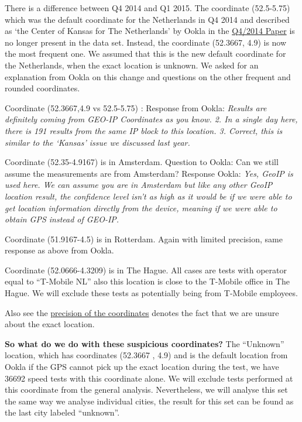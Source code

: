 \documentclass[]{article}
\begin{document}
There is a difference between Q4 2014 and Q1 2015. The coordinate
(52.5-5.75) which was the default coordinate for the Netherlands in Q4
2014 and described as `the Center of Kansas for The Netherlands' by
Ookla in the
\href{https://github.com/hugokoopmans/ookla-speedtest-analysis/blob/master/speedtest-analysis-final-1.3.pdf}{Q4/2014
Paper} is no longer present in the data set. Instead, the coordinate
(52.3667, 4.9) is now the most frequent one. We assumed that this is the
new default coordinate for the Netherlands, when the exact location is
unknown. We asked for an explanation from Ookla on this change and
questions on the other frequent and rounded coordinates.

Coordinate (52.3667,4.9 vs 52.5-5.75) : Response from Ookla:
\emph{Results are definitely coming from GEO-IP Coordinates as you know.
2. In a single day here, there is 191 results from the same IP block to
this location. 3. Correct, this is similar to the `Kansas' issue we
discussed last year.}

Coordinate (52.35-4.9167) is in Amsterdam. Question to Ookla: Can we
still assume the measurements are from Amsterdam? Response Ookla:
\emph{Yes, GeoIP is used here. We can assume you are in Amsterdam but
like any other GeoIP location result, the confidence level isn't as high
as it would be if we were able to get location information directly from
the device, meaning if we were able to obtain GPS instead of GEO-IP.}

Coordinate (51.9167-4.5) is in Rotterdam. Again with limited precision,
same response as above from Ookla.

Coordinate (52.0666-4.3209) is in The Hague. All cases are tests with
operator equal to ``T-Mobile NL'' also this location is close to the
T-Mobile office in The Hague. We will exclude these tests as potentially
being from T-Mobile employees.

Also see the
\href{https://en.wikipedia.org/wiki/Decimal_degrees}{precision of the
coordinates} denotes the fact that we are unsure about the exact
location.

\textbf{So what do we do with these suspicious coordinates?} The
``Unknown'' location, which has coordinates (52.3667 , 4.9) and is the
default location from Ookla if the GPS cannot pick up the exact location
during the test, we have 36692 speed tests with this coordinate alone.
We will exclude tests performed at this coordinate from the general
analysis. Nevertheless, we will analyse this set the same way we analyse
individual cities, the result for this set can be found as the last city
labeled ``unknown''.
\end{document}
